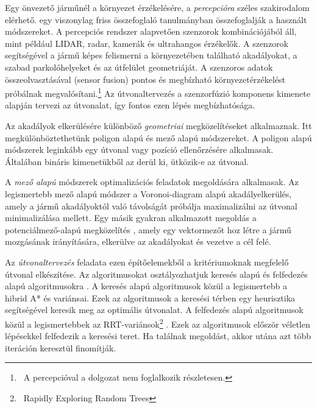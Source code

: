 \documentclass{article}
\begin{document}
Egy önvezető járműnél a környezet érzékelésére, a \textit{percepcióra} széles szakirodalom elérhető. \citeauthor{yeong2021sensorFusion} egy viszonylag friss összefoglaló tanulmányban \cite{yeong2021sensorFusion} összefoglalják a használt módszereket. A percepciós rendszer alapvetően szenzorok kombinációjából áll, mint például LIDAR, radar, kamerák és ultrahangos érzékelők. A szenzorok segítségével a jármű képes felismerni a környezetében található akadályokat, a szabad parkolóhelyeket és az útfelület geometriáját. A szenzoros adatok összeolvasztásával (sensor fusion) pontos és megbízható környezetérzékelést próbálnak megvalósítani.\footnote{~A percepcióval a dolgozat nem foglalkozik részletesen.} Az útvonaltervezés a szenzorfúzió komponens kimenete alapján tervezi az útvonalat, így fontos ezen lépés megbízhatósága.

Az akadályok elkerülésére különböző \textit{geometriai} megközelítéseket alkalmaznak. Itt megkülönböztethetünk poligon alapú és mező alapú módszereket. A poligon alapú módszerek \cite[7--8.~fejezet]{preparata2012computationalGeometry} leginkább egy útvonal vagy pozíció ellenőrzésére alkalmasak. Általában bináris kimenetükből az derül ki, ütközik-e az útvonal. 

A \textit{mező alapú} módszerek optimalizációs feladatok megoldására alkalmasak. Az legismertebb mező alapú módszer a Voronoi-diagram alapú akadályelkerülés, amely a jármű akadályoktól való távolságát próbálja maximalizálni az útvonal minimalizálása mellett. Egy másik gyakran alkalmazott megoldás a potenciálmező-alapú megközelítés \cite{tanzmeister2014efficientCollisionField, ziegler2010fastOccupancyGrid}, amely egy vektormezőt hoz létre a jármű mozgásának irányítására, elkerülve az akadályokat és vezetve a cél felé. 

Az \textit{útvonaltervezés} feladata ezen építőelemekből a kritériumoknak megfelelő útvonal elkészítése. Az algoritmusokat osztályozhatjuk keresés alapú és felfedezés alapú algoritmusokra \cite{gonzalez2015review}. A keresés alapú algoritmusok közül a legismertebb a hibrid A* \cite{dolgov2008hybridAstar} és variánsai. Ezek az algoritmusok a keresési térben egy heurisztika segítségével keresik meg az optimális útvonalat. A felfedezés alapú algoritmusok közül a legismertebbek az RRT-variánsok\footnote{~Rapidly Exploring Random Trees} \cite{noreen2016RRTsurvey}. Ezek az algoritmusok először véletlen lépésekkel felfedezik a keresési teret. Ha találnak megoldást, akkor utána azt több iteráción keresztül finomítják.
\end{document}
